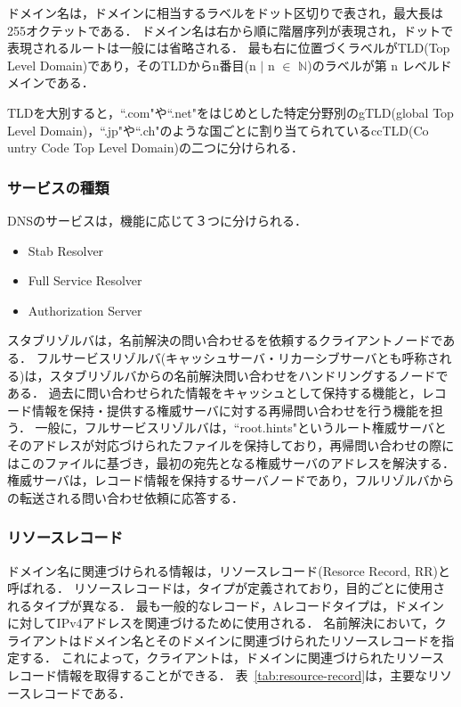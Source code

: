 ドメイン名は，ドメインに相当するラベルをドット区切りで表され，最大長は255オクテットである．
ドメイン名は右から順に階層序列が表現され，ドットで表現されるルートは一般には省略される．
最も右に位置づくラベルがTLD(Top Level Domain)であり，そのTLDからn番目(n $\mid$ n $\in$ $\mathbb{N}$)のラベルが第 n レベルドメインである．

TLDを大別すると，``.com"や``.net"をはじめとした特定分野別のgTLD(global Top Level Domain)，``.jp"や``.ch"のような国ごとに割り当てられているccTLD(Co\\untry Code Top Level Domain)の二つに分けられる．


\subsubsection{サービスの種類}
DNSのサービスは，機能に応じて３つに分けられる．
\begin{itemize}
 \item Stab Resolver
 \vspace{-3mm}
 \item Full Service Resolver
 \vspace{-3mm}
 \item Authorization Server
\end{itemize}

スタブリゾルバは，名前解決の問い合わせるを依頼するクライアントノードである．
フルサービスリゾルバ(キャッシュサーバ・リカーシブサーバとも呼称される)は，スタブリゾルバからの名前解決問い合わせをハンドリングするノードである．
過去に問い合わせられた情報をキャッシュとして保持する機能と，レコード情報を保持・提供する権威サーバに対する再帰問い合わせを行う機能を担う．
一般に，フルサービスリゾルバは，``root.hints"というルート権威サーバとそのアドレスが対応づけられたファイルを保持しており，再帰問い合わせの際にはこのファイルに基づき，最初の宛先となる権威サーバのアドレスを解決する．
権威サーバは，レコード情報を保持するサーバノードであり，フルリゾルバからの転送される問い合わせ依頼に応答する．

\subsubsection{リソースレコード}
ドメイン名に関連づけられる情報は，リソースレコード(Resorce Record, RR)と呼ばれる．
リソースレコードは，タイプが定義されており，目的ごとに使用されるタイプが異なる．
最も一般的なレコード，Aレコードタイプは，ドメインに対してIPv4アドレスを関連づけるために使用される．
名前解決において，クライアントはドメイン名とそのドメインに関連づけられたリソースレコードを指定する．
これによって，クライアントは，ドメインに関連づけられたリソースレコード情報を取得することができる．
表~\ref{tab:resource-record}は，主要なリソースレコードである．


